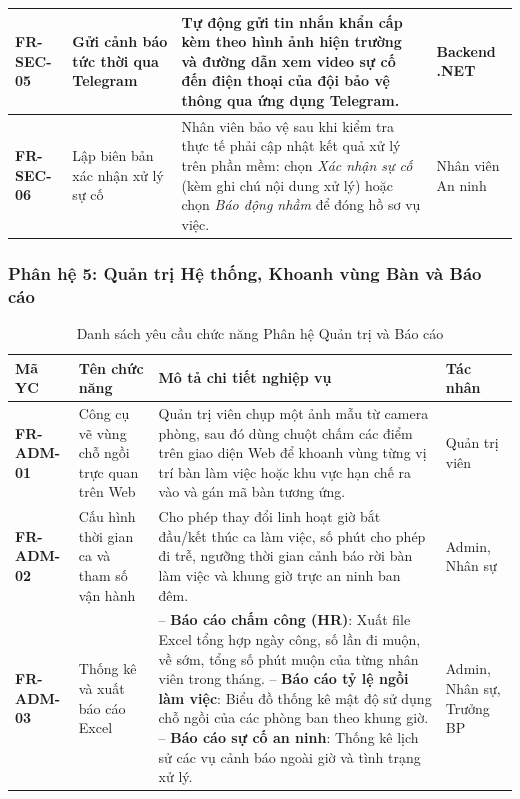 \documentclass[12pt,a4paper]{article}
\begin{document}
\begin{longtable}{|C{\tabcolsep\relax}|L{\tabcolsep\relax}|L{\tabcolsep\relax}|C{\tabcolsep\relax}|}
\hline
\textbf{FR-SEC-05} & Gửi cảnh báo tức thời qua Telegram & Tự động gửi tin nhắn khẩn cấp kèm theo hình ảnh hiện trường và đường dẫn xem video sự cố đến điện thoại của đội bảo vệ thông qua ứng dụng Telegram. & Backend .NET \\
\hline
{}
\textbf{FR-SEC-06} & Lập biên bản xác nhận xử lý sự cố & Nhân viên bảo vệ sau khi kiểm tra thực tế phải cập nhật kết quả xử lý trên phần mềm: chọn \textit{Xác nhận sự cố} (kèm ghi chú nội dung xử lý) hoặc chọn \textit{Báo động nhầm} để đóng hồ sơ vụ việc. & Nhân viên An ninh \\
\hline
\end{longtable}

\subsubsection{Phân hệ 5: Quản trị Hệ thống, Khoanh vùng Bàn và Báo cáo}

\begin{longtable}{|C{\tabcolsep\relax}|L{\tabcolsep\relax}|L{\tabcolsep\relax}|C{\tabcolsep\relax}|}
\caption{Danh sách yêu cầu chức năng Phân hệ Quản trị và Báo cáo}\\
\hline
{}
\textbf{Mã YC} & \textbf{Tên chức năng} & \textbf{Mô tả chi tiết nghiệp vụ} & \textbf{Tác nhân} \\
\hline
\textbf{FR-ADM-01} & Công cụ vẽ vùng chỗ ngồi trực quan trên Web & Quản trị viên chụp một ảnh mẫu từ camera phòng, sau đó dùng chuột chấm các điểm trên giao diện Web để khoanh vùng từng vị trí bàn làm việc hoặc khu vực hạn chế ra vào và gán mã bàn tương ứng. & Quản trị viên \\
\hline
{}
\textbf{FR-ADM-02} & Cấu hình thời gian ca và tham số vận hành & Cho phép thay đổi linh hoạt giờ bắt đầu/kết thúc ca làm việc, số phút cho phép đi trễ, ngưỡng thời gian cảnh báo rời bàn làm việc và khung giờ trực an ninh ban đêm. & Admin, Nhân sự \\
\hline
\textbf{FR-ADM-03} & Thống kê và xuất báo cáo Excel & -- \textbf{Báo cáo chấm công (HR)}: Xuất file Excel tổng hợp ngày công, số lần đi muộn, về sớm, tổng số phút muộn của từng nhân viên trong tháng.\newline
-- \textbf{Báo cáo tỷ lệ ngồi làm việc}: Biểu đồ thống kê mật độ sử dụng chỗ ngồi của các phòng ban theo khung giờ.\newline
-- \textbf{Báo cáo sự cố an ninh}: Thống kê lịch sử các vụ cảnh báo ngoài giờ và tình trạng xử lý. & Admin, Nhân sự, Trưởng BP \\
\hline
\end{longtable}
\end{document}
